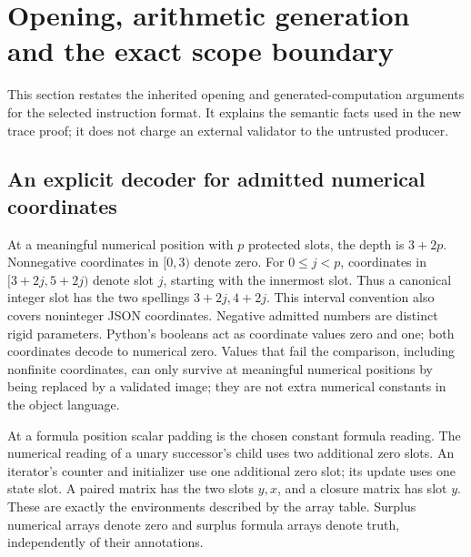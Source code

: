 \section{Opening, arithmetic generation and the exact scope boundary}
\label{sec:opening-details}

This section restates the inherited opening and generated-computation
arguments \cite{arity,certified} for the selected instruction format.
It explains the semantic facts used in the new trace proof; it does not
charge an external validator to the untrusted producer.

\subsection{An explicit decoder for admitted numerical coordinates}

At a meaningful numerical position with \(p\) protected slots, the
depth is \(3+2p\). Nonnegative coordinates in \([0,3)\) denote zero.
For \(0\le j<p\), coordinates in \([3+2j,5+2j)\) denote slot \(j\),
starting with the innermost slot. Thus a canonical integer slot has
the two spellings \(3+2j,4+2j\). This interval convention also covers
noninteger JSON coordinates. Negative admitted numbers are distinct
rigid parameters. Python's booleans act as coordinate values zero and
one; both coordinates decode to numerical zero. Values that fail the comparison,
including nonfinite coordinates, can only survive at meaningful
numerical positions by being replaced by a validated image; they are
not extra numerical constants in the object language.

At a formula position scalar padding is the chosen constant formula
reading. The numerical reading of a unary successor's child uses two
additional zero slots. An iterator's counter and initializer use one
additional zero slot; its update uses one state slot. A paired matrix
has the two slots \(y,x\), and a closure matrix has slot \(y\).
These are exactly the environments described by the array table.
Surplus numerical arrays denote zero and surplus formula arrays denote
truth, independently of their annotations.

